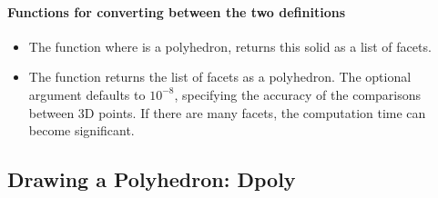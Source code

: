\paragraph{Functions for converting between the two definitions}
\begin{itemize}
    \item The function  where  is a polyhedron, returns this solid as a list of facets.
    \item The function  returns the list of facets  as a polyhedron. The optional argument  defaults to $10^{-8}$, specifying the accuracy of the comparisons between 3D points. If there are many facets, the computation time can become significant.
\end{itemize}

\subsection{Drawing a Polyhedron: Dpoly}

